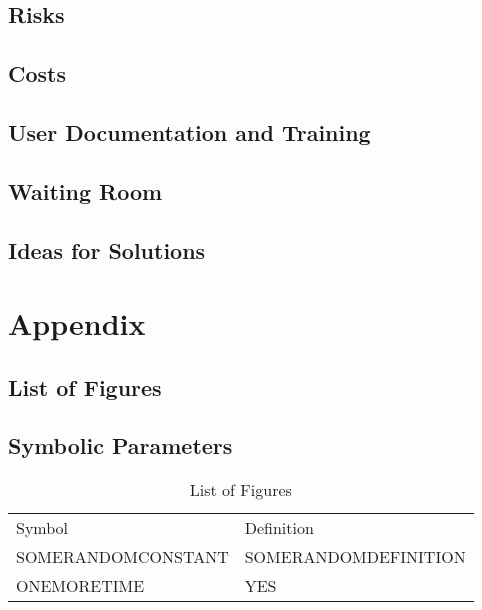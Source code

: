 \documentclass[12pt, titlepage]{article}
\begin{document}
\subsection{Risks}

\subsection{Costs}

\subsection{User Documentation and Training}

\subsection{Waiting Room}

\subsection{Ideas for Solutions}





\newpage

\section{Appendix}


\subsection{List of Figures}

\subsection{Symbolic Parameters}

\begin{table}[h!]
\centering
\label{LOF}
\begin{tabular}{ll}
Symbol & Definition \\
SOMERANDOMCONSTANT & SOMERANDOMDEFINITION  \\
ONEMORETIME & YES\\ 
\end{tabular}
\caption{List of Figures}
\end{table}
\end{document}
